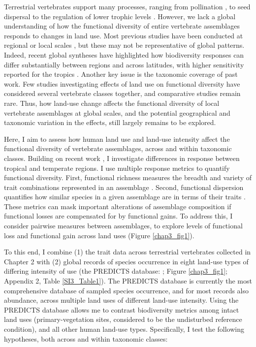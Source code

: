 Terrestrial vertebrates support many processes, ranging from pollination \citep{Ratto2018}, to seed dispersal to the regulation of lower trophic levels \citep{Barber2010, Letnic2012, Salo2010,Zhang2018_trophicinter}. However, we lack a global understanding of how the functional diversity of entire vertebrate assemblages responds to changes in land use. Most previous studies have been conducted at regional or local scales \citep{Davison2021}, but these may not be representative of global patterns. Indeed, recent global syntheses have highlighted how biodiversity responses can differ substantially between regions and across latitudes, with higher sensitivity reported for the tropics \citep{Matuoka2020,Millard2021, Newbold2020}. Another key issue is the taxonomic coverage of past work. Few studies investigating effects of land use on functional diversity have considered several vertebrate classes together, and comparative studies remain rare. Thus, how land-use change affects the functional diversity of local vertebrate assemblages at global scales, and the potential geographical and taxonomic variation in the effects, still largely remains to be explored.

Here, I aim to assess how human land use and land-use intensity affect the functional diversity of vertebrate assemblages, across and within taxonomic classes. Building on recent work \citep{Matuoka2020,Millard2021, Newbold2020}, I investigate differences in response between tropical and temperate regions. I use multiple response metrics to quantify functional diversity. First, functional richness measures the breadth and variety of trait combinations represented in an assemblage \citep{Legras2018}. Second, functional dispersion quantifies how similar species in a given assemblage are in terms of their traits \citep{Laliberte2010}. These metrics can mask important alterations of assemblage composition if functional losses are compensated for by functional gains. To address this, I consider pairwise measures between assemblages, to explore levels of functional loss and functional gain across land uses (Figure \ref{chap3_fig1}).



To this end, I combine (1) the trait data across terrestrial vertebrates collected in Chapter 2 with (2) global records of species occurrence in eight land-use types of differing intensity of use (the PREDICTS database: \citet{Hudson2014, Hudson2017}; Figure \ref{chap3_fig1}; Appendix 2, Table \ref{SI3_Table1}). The PREDICTS database is currently the most comprehensive database of sampled species occurrence, and for most records also abundance, across multiple land uses of different land-use intensity. Using the PREDICTS database allows me to contrast biodiversity metrics among intact land uses (primary-vegetation sites, considered to be the undisturbed reference condition), and all other human land-use types. Specifically, I test the following hypotheses, both across and within taxonomic classes:

